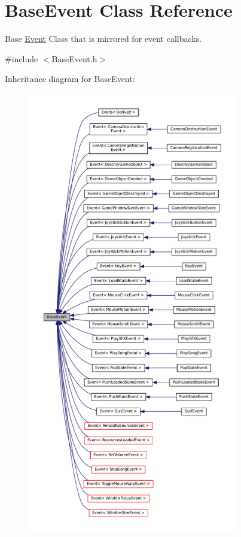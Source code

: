 \hypertarget{classBaseEvent}{}\section{Base\+Event Class Reference}
\label{classBaseEvent}


Base \hyperlink{classEvent}{Event} Class that is mirrored for event callbacks.  




{\ttfamily \#include $<$Base\+Event.\+h$>$}



Inheritance diagram for Base\+Event\+:
\nopagebreak
\begin{figure}[H]
\begin{center}
\leavevmode
\includegraphics[height=550pt]{classBaseEvent__inherit__graph}
\end{center}
\end{figure}

